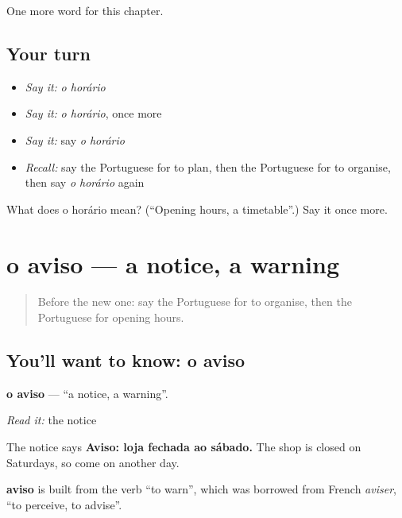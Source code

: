 \begin{grammarlens}[title={What you've built}]
One more word for this chapter.
\end{grammarlens}

\subsection*{Your turn}
\begin{itemize}
\raggedright
  \item \emph{Say it:} \emph{o horário}
  \item \emph{Say it:} \emph{o horário}, once more
  \item \emph{Say it:} say \emph{o horário}
  \item \emph{Recall:} say the Portuguese for to plan, then the Portuguese for to organise, then say \emph{o horário} again
\end{itemize}

\begin{tcolorbox}[breakable,colback=teal!4,colframe=teal!35!black,title={Before you move on}]
What does o horário mean? (\textquotedblleft{}Opening hours, a timetable\textquotedblright{}.) Say it once more.
\end{tcolorbox}
\section[o aviso]{o aviso — a notice, a warning}

\label{lesson:PT-C137-o-aviso}



\begin{quote}
Before the new one: say the Portuguese for to organise, then the Portuguese for opening hours.
\end{quote}

\subsection*{You'll want to know: o aviso}
\textbf{o aviso} — \textquotedblleft{}a notice, a warning\textquotedblright{}.

\emph{Read it:} the notice

The notice says \textbf{Aviso: loja fechada ao sábado.} The shop is closed on Saturdays, so come on another day.

\begin{cousinweb}
\textbf{aviso} is built from the verb \textquotedblleft{}to warn\textquotedblright{}, which was borrowed from French \emph{aviser}, \textquotedblleft{}to perceive, to advise\textquotedblright{}.
\end{cousinweb}

